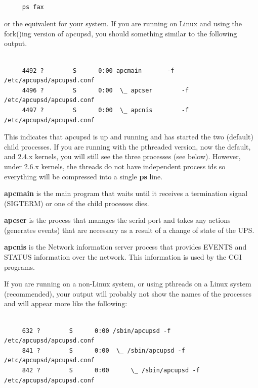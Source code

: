 \footnotesize
\begin{verbatim}
     
     ps fax
\end{verbatim}
\normalsize

or the equivalent for your system. If you are running on Linux and using the
fork()ing version of apcupsd, you should something similar to the following
output. 

\footnotesize
\begin{verbatim}
     
     4492 ?        S      0:00 apcmain       -f /etc/apcupsd/apcupsd.conf
     4496 ?        S      0:00  \_ apcser        -f /etc/apcupsd/apcupsd.conf
     4497 ?        S      0:00  \_ apcnis        -f /etc/apcupsd/apcupsd.conf
\end{verbatim}
\normalsize

This indicates that apcupsd is up and running and has started the two
(default) child processes. If you are running with the pthreaded version, now
the default, and 2.4.x kernels, you will still see the three processes (see
below).  However, under 2.6.x kernels, the threads do not have independent
process ids so everything will be compressed into a single {\bf ps} line.  

\begin{description}

\item {\bf apcmain}
is the main program that waits until it receives a termination signal
(SIGTERM) or one of the child processes dies.  

\item {\bf apcser}
is the process that manages the serial port and takes any actions (generates
events) that are necessary as a result of a change of state of the UPS.  

\item {\bf apcnis}
is the Network information server process that provides EVENTS and STATUS
information over the network. This information is used by the CGI programs. 
\end{description}

If you are running on a non-Linux system, or using pthreads on a Linux system
(recommended), your output will probably not show the names of the processes
and will appear more like the following: 

\footnotesize
\begin{verbatim}
     
     632 ?        S      0:00 /sbin/apcupsd -f /etc/apcupsd/apcupsd.conf
     841 ?        S      0:00  \_ /sbin/apcupsd -f /etc/apcupsd/apcupsd.conf
     842 ?        S      0:00      \_ /sbin/apcupsd -f /etc/apcupsd/apcupsd.conf
\end{verbatim}
\normalsize

